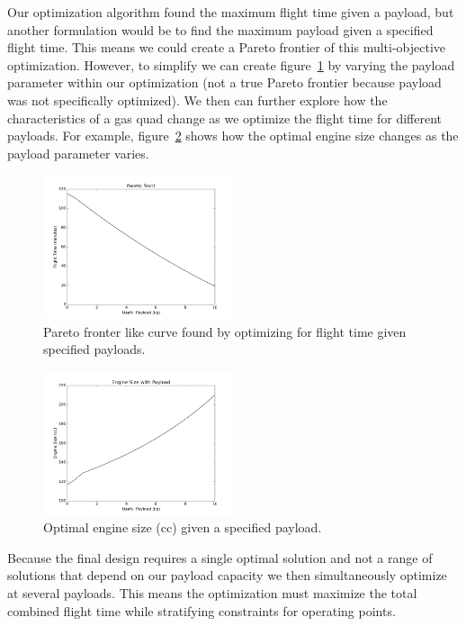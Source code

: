 \documentclass[letterpaper, 10 pt, conference]{ieeeconf}  %
\begin{document}
Our optimization algorithm found the maximum flight time given a payload, but another formulation would be to find the maximum payload given a specified flight time. This means we could create a Pareto frontier of this multi-objective optimization. However, to simplify we can create figure~\ref{fig:payload} by varying the payload parameter within our optimization (not a true Pareto frontier because payload was not specifically optimized). We then can further explore how the characteristics of a gas quad change as we optimize the flight time for different payloads. For example, figure~\ref{fig:eng_v_pl} shows how the optimal engine size changes as the payload parameter varies. 

\begin{figure}
	\includegraphics[width=0.5\textwidth]{pareto_front.png}
	\caption{Pareto fronter like curve found by optimizing for flight time given specified payloads.}
		\label{fig:payload}
\end{figure}

\begin{figure}
	\includegraphics[width=0.5\textwidth]{engine_size_vs_payload.png}
	\caption{Optimal engine size (cc) given a specified payload.}
		\label{fig:eng_v_pl}
\end{figure}

Because the final design requires a single optimal solution and not a range of solutions that depend on our payload capacity we then simultaneously optimize at several payloads. This means the optimization must maximize the total combined flight time while stratifying constraints for operating points.
\end{document}

